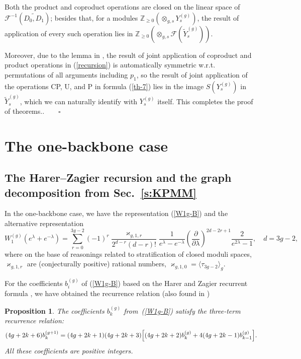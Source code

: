 \documentclass[11pt]{article}
\def\<{\langle}
\def\>{\rangle}
\def\beq{\begin{equation}}
\def\eeq{\end{equation}}
\theoremstyle{plain}
\newtheorem{proposition}{Proposition}
\theoremstyle{definition}
\def\beq{\begin{equation}}
\def\eeq{\end{equation}}
\begin{document}
Both the product and coproduct operations are closed on the linear space of ${\mathcal F}^{-1}(\widetilde{D_0,D_1})$; besides that, for a modules
${\mathbb Z}_{\ge0}(\mathop{\otimes}_{g,s}Y_{s}^{(g)})$, the result of application of every such operation lies in 
${\mathbb Z}_{\ge0}(\mathop{\otimes}_{g,s}{\mathcal F}(\widetilde Y_{s}^{(g)}))$.

Moreover, due to the lemma in \cite{ChEy}, the result of joint application of coproduct and product operations in  (\ref{recursion})
is automatically symmetric w.r.t. permutations of all arguments including $p_1$, so the result of joint application
of the operations CP, U, and P  in formula (\ref{th-7})
lies in the image $S(Y^{(g)}_s)$ in $\widetilde Y^{(g)}_s$, which we can naturally identify with
$Y^{(g)}_s$ itself. This completes the proof of theorems.$.\qquad\square$



\section{The one-backbone case}
\label{s:HZ}
\setcounter{equation}{0}

\subsection{The Harer--Zagier recursion and the graph decomposition from Sec.~\ref{s:KPMM}}

In the one-backbone case, we have the representation (\ref{W1g-B}) and the alternative representation
\beq
W^{(g)}_1(e^{\lambda}+e^{-\lambda})=\sum_{r=0}^{3g-2}
(-1)^r \frac{\varkappa_{g,1,r}}{2^{d-r}(d-r)!}\frac{1}{e^{\lambda}-e^{-\lambda}}
\left(\frac{\partial}{\partial \lambda}\right)^{2d-2r+1}\frac{2}{e^{2\lambda}-1},\quad d=3g-2,
\label{one-bone}
\eeq
where on the base of reasonings related to stratification of closed moduli spaces,
$\varkappa_{g,1,r}$ are (conjecturally positive) rational numbers, $\varkappa_{g,1,0}=\<\tau_{3g-2}\>_g$.

For the coefficients $b^{(g)}_i$ of (\ref{W1g-B}) based on the Harer and Zagier recurrent formula \cite{HZ},
 we have obtained the recurrence relation (also found in  \cite{HT})

\begin{proposition}
\label{th5} {\rm\cite{ACNP}}
The coefficients $b^{(g)}_k$ from~(\ref{W1g-B}) satisfy the three-term recurrence relation:
\beq
\label{recurrence}
(4g+2k+6)b^{(g+1)}_k=(4g+2k+1)(4g+2k+3)\Bigl[(4g+2k+2)b^{(g)}_k+4(4g+2k-1)b^{(g)}_{k-1}\Bigr].
\eeq
All these coefficients are positive integers.
\end{proposition}
\end{document}
